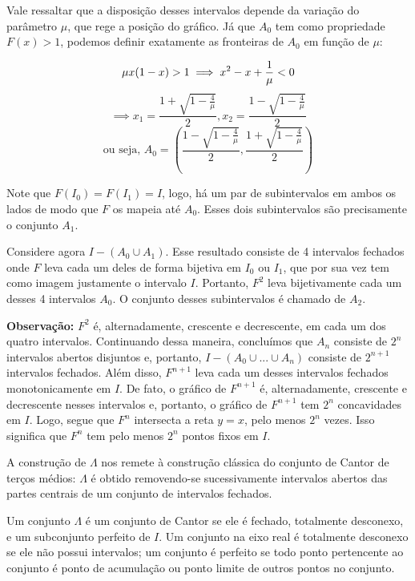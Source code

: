 \documentclass[../IC.tex]{subfiles}
\begin{document}
	Vale ressaltar que a disposição desses intervalos depende da variação do parâmetro $\mu$, que rege a posição do gráfico. Já que $A_0$ tem como propriedade $F(x) > 1$, podemos definir exatamente as fronteiras de $A_0$ em função de $\mu$:
	
	$$\mu\/x(1-x) > 1 \implies x^2-x+\frac{1}{\mu}<0$$
	$$\implies x_1 = \dfrac{1+ \sqrt{1-\frac{4}{\mu}}}{2}, x_2 = \dfrac{1- \sqrt{1-\frac{4}{\mu}}}{2}$$
	$$\text{ou seja, } A_0 = \left(\dfrac{1- \sqrt{1-\frac{4}{\mu}}}{2}, \dfrac{1+ \sqrt{1-\frac{4}{\mu}}}{2}\right)$$
	
	Note que $F(I_0) = F(I_1) = I$, logo, há um par de subintervalos em ambos os lados de modo que $F$ os mapeia até $A_0$. Esses dois subintervalos são precisamente o conjunto $A_1$.
	
	Considere agora $I-(A_0 \cup A_1)$. Esse resultado consiste de 4 intervalos fechados onde $F$ leva cada um deles de forma bijetiva em $I_0$ ou $I_1$, que por sua vez tem como imagem justamente o intervalo $I$. Portanto, $F^2$ leva bijetivamente cada um desses 4 intervalos $A_0$. O conjunto desses subintervalos é chamado de $A_2$.
	
	\textbf{Observação:} $F^2$ é, alternadamente, crescente e decrescente, em cada um dos quatro intervalos. Continuando dessa maneira, concluímos que $A_n$ consiste de $2^n$ intervalos abertos disjuntos e, portanto, $I - (A_0 \cup ... \cup A_n)$ consiste de $2^{n+1}$ intervalos fechados. Além disso, $F^{n+1}$ leva cada um desses intervalos fechados monotonicamente em $I$. De fato, o gráfico de $F^{n+1}$ é, alternadamente, crescente e decrescente nesses intervalos e, portanto, o gráfico de $F^{n+1}$ tem $2^n$ concavidades em $I$. Logo, segue que $F^n$ intersecta a reta $y=x$, pelo menos $2^n$ vezes. Isso significa que $F^n$ tem pelo menos $2^n$ pontos fixos em $I$.
	
	A construção de $\Lambda$ nos remete à construção clássica do conjunto de Cantor de terços médios: $\Lambda$ é obtido removendo-se sucessivamente intervalos abertos das partes centrais de um conjunto de intervalos fechados.
	
	\begin{definicao}
		Um conjunto $\Lambda$ é um conjunto de Cantor se ele é fechado, totalmente desconexo, e um subconjunto perfeito de $I$. Um conjunto na eixo real é totalmente desconexo se ele não possui intervalos; um conjunto é perfeito se todo ponto pertencente ao conjunto é ponto de acumulação ou ponto limite de outros pontos no conjunto.
	\end{definicao}
	
\end{document}
